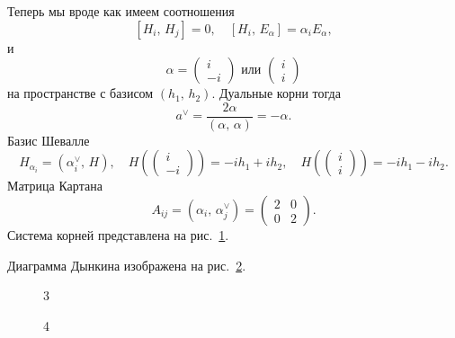 \documentclass[a4paper]{article}
\begin{document}
Теперь мы вроде как имеем соотношения
\[
\left[ H_i,\,H_j \right] =0,\quad \left[ H_i,\,E_\alpha \right] =\alpha_i E_\alpha
,\] 
и
\[
	\alpha=\begin{pmatrix}i\\-i  \end{pmatrix} \text{ или }\begin{pmatrix} i\\i \end{pmatrix} 
\] 
на пространстве с базисом $(h_1,\,h_2)$. Дуальные корни тогда
\[
	a^\vee= \frac{2\alpha}{(\alpha,\,\alpha)}= -\alpha
.\] 
Базис Шевалле
\[
	H_{\alpha_i}=\left( \alpha_i^\vee,\,H \right),\quad
	H\left( \begin{pmatrix} i\\-i \end{pmatrix}  \right) =
	-ih_1+ih_2,\quad
	H\left( \begin{pmatrix} i\\i \end{pmatrix}  \right) =
	-ih_1-ih_2
.\] 
Матрица Картана
\[
	A_{ij}=\left( \alpha_i,\,\alpha_j^{\vee} \right) =
	\begin{pmatrix} 2 &0\\
	0& 2\end{pmatrix} 
.\] 
Система корней представлена на рис.~\ref{fig:1}.
\begin{figure}[ht]
    \centering
    \caption{}
    \label{fig:1}
\end{figure}
Диаграмма Дынкина изображена на рис.~\ref{fig:2}.
\begin{figure}[ht]
    \centering
    \caption{}
    \label{fig:2}
\end{figure}
\begin{figure}[ht]
    \centering
    \caption{3}
    \label{fig:3}
\end{figure}
\begin{figure}[ht]
    \centering
    \caption{4}
    \label{fig:4}
\end{figure}
\end{document}
